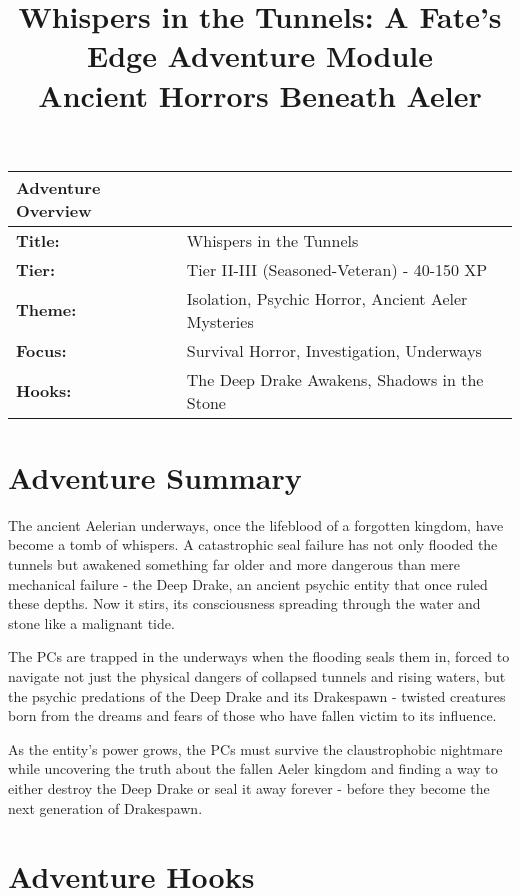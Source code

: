 \documentclass[11pt]{article}
\title{\textbf{Whispers in the Tunnels: A Fate's Edge Adventure Module}\\
\large Ancient Horrors Beneath Aeler}
\author{}
\date{}
\begin{document}
\maketitle

\begin{center}
\begin{tabular}{|p{2.5cm}|p{12cm}|}
\hline
\textbf{Adventure Overview} & \\
\hline
\textbf{Title:} & Whispers in the Tunnels \\
\textbf{Tier:} & Tier II-III (Seasoned-Veteran) - 40-150 XP \\
\textbf{Theme:} & Isolation, Psychic Horror, Ancient Aeler Mysteries \\
\textbf{Focus:} & Survival Horror, Investigation, Underways \\
\textbf{Hooks:} & The Deep Drake Awakens, Shadows in the Stone \\
\hline
\end{tabular}
\end{center}

\section{Adventure Summary}

The ancient Aelerian underways, once the lifeblood of a forgotten kingdom, have become a tomb of whispers. A catastrophic seal failure has not only flooded the tunnels but awakened something far older and more dangerous than mere mechanical failure - the Deep Drake, an ancient psychic entity that once ruled these depths. Now it stirs, its consciousness spreading through the water and stone like a malignant tide.

The PCs are trapped in the underways when the flooding seals them in, forced to navigate not just the physical dangers of collapsed tunnels and rising waters, but the psychic predations of the Deep Drake and its Drakespawn - twisted creatures born from the dreams and fears of those who have fallen victim to its influence.

As the entity's power grows, the PCs must survive the claustrophobic nightmare while uncovering the truth about the fallen Aeler kingdom and finding a way to either destroy the Deep Drake or seal it away forever - before they become the next generation of Drakespawn.

\section{Adventure Hooks}
\end{document}
